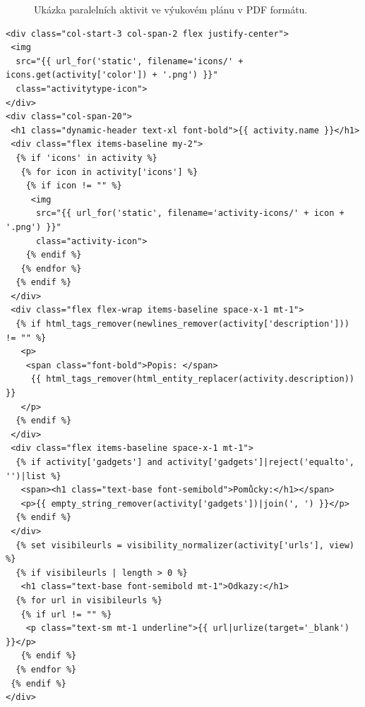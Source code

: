\documentclass[male,czech,api_bc]{kitheses}
\begin{document}
\begin{figure}[H]
	\centering
	\caption{Ukázka paralelních aktivit ve výukovém plánu v PDF formátu.}
	\label{fig:edubo-3}
\end{figure}

\begin{lstlisting}
<div class="col-start-3 col-span-2 flex justify-center">
 <img
  src="{{ url_for('static', filename='icons/' + icons.get(activity['color']) + '.png') }}"
  class="activitytype-icon">
</div>
<div class="col-span-20">
 <h1 class="dynamic-header text-xl font-bold">{{ activity.name }}</h1>
 <div class="flex items-baseline my-2">
  {% if 'icons' in activity %}
   {% for icon in activity['icons'] %}
    {% if icon != "" %}
     <img
      src="{{ url_for('static', filename='activity-icons/' + icon + '.png') }}"
      class="activity-icon">
    {% endif %}
   {% endfor %}
  {% endif %}
 </div>
 <div class="flex flex-wrap items-baseline space-x-1 mt-1">
  {% if html_tags_remover(newlines_remover(activity['description'])) != "" %}
   <p>
    <span class="font-bold">Popis: </span>
     {{ html_tags_remover(html_entity_replacer(activity.description)) }}
   </p>
  {% endif %}
 </div>
 <div class="flex items-baseline space-x-1 mt-1">
  {% if activity['gadgets'] and activity['gadgets']|reject('equalto', '')|list %}
   <span><h1 class="text-base font-semibold">Pomůcky:</h1></span>
   <p>{{ empty_string_remover(activity['gadgets'])|join(', ') }}</p>
  {% endif %}
 </div>
  {% set visibileurls = visibility_normalizer(activity['urls'], view) %}
  {% if visibileurls | length > 0 %}
   <h1 class="text-base font-semibold mt-1">Odkazy:</h1>
  {% for url in visibileurls %}
   {% if url != "" %}
    <p class="text-sm mt-1 underline">{{ url|urlize(target='_blank') }}</p>
   {% endif %}
  {% endfor %}
 {% endif %}
</div>
\end{lstlisting}
\end{document}
